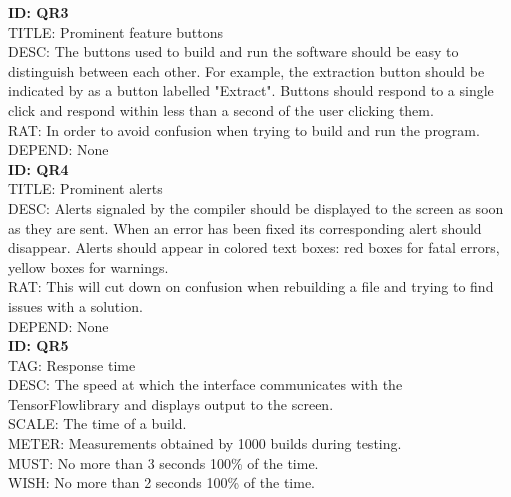 \documentclass[journal,10pt,onecolumn,compsoc]{IEEEtran} \usepackage[margin=1.0in]{geometry} \usepackage{pdfpages} \usepackage{graphicx}
\begin{document}
\noindent
\textbf{ID: QR3}\\
TITLE: Prominent feature buttons\\
DESC: The buttons used to build and run the software should be easy to distinguish between each other. 
For example, the extraction button should be indicated by as a button labelled "Extract".
Buttons should respond to a single click and respond within less than a second of the user clicking them.\\
RAT: In order to avoid confusion when trying to build and run the program.\\
DEPEND: None\\

\noindent
\textbf{ID: QR4}\\
TITLE: Prominent alerts\\
DESC: Alerts signaled by the compiler should be displayed to the screen as soon as they are sent. 
When an error has been fixed its corresponding alert should disappear.
Alerts should appear in colored text boxes: red boxes for fatal errors, yellow boxes for warnings.\\
RAT: This will cut down on confusion when rebuilding a file and trying to find issues with a solution.\\
DEPEND: None\\

\noindent
\textbf{ID: QR5}\\
TAG: Response time\\
DESC: The speed at which the interface communicates with the TensorFlow\texttrademark library and displays output to the screen.\\
SCALE: The time of a build.\\
METER: Measurements obtained by 1000 builds during testing.\\
MUST: No more than 3 seconds 100\% of the time.\\
WISH: No more than 2 seconds 100\% of the time.\\




\end{document}
